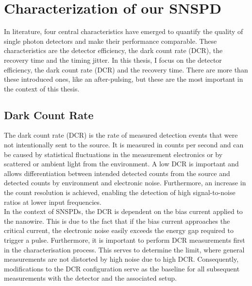 

\chapter{Characterization of our SNSPD}
\label{sec:SNSPD_Characterization}

In literature, four central characteristics have emerged to quantify the quality of single photon detectors and
make their performance comparable.
These characteristics are the detector efficiency, the dark count rate (DCR), the recovery time and the timing jitter.
In this thesis, I focus on the detector efficiency, the dark count rate (DCR) and the recovery time.
There are more than these introduced ones, like an after-pulsing, but these are the most important in the context
of this thesis.

\section{Dark Count Rate}\label{sec:dark-count-rate}
The dark count rate (DCR) is the rate of measured detection events that were not intentionally sent to the source.
It is measured in counts per second and can be caused by statistical fluctuations in the measurement electronics
or by scattered or ambient light from the environment.
A low DCR is important and allows differentiation between intended detected counts from the source and detected counts
by environment and electronic noise.
Furthermore, an increase in the count resolution is achieved, enabling the detection of high signal-to-noise ratios at
lower input frequencies.\\

In the context of SNSPDs, the DCR is dependent on the bias current applied to the nanowire.
This is due to the fact that if the bias current approaches the critical current, the electronic noise easily exceeds
the energy gap required to trigger a pulse.
Furthermore, it is important to perform DCR measurements first in the characterisation process.
This serves to determine the limit, where general measurements are not distorted by high noise due to high DCR.
Consequently, modifications to the DCR configuration serve as the baseline for all subsequent measurements
with the detector and the associated setup.

